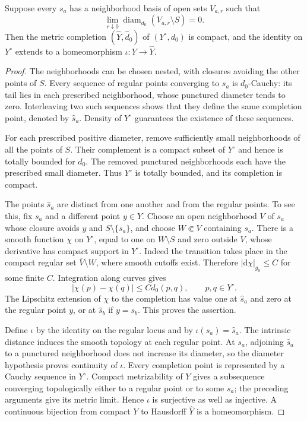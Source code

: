 \begin{lemma}\label{lem:finite-puncture-completion}
Suppose every $s_a$ has a neighborhood basis of open sets $V_{a,r}$ such that
\[
 \lim_{r\downarrow0}\operatorname{diam}_{d_0}(V_{a,r}\setminus S)=0.
\]
Then the metric completion $(\widehat Y,\widehat d_0)$ of $(Y^\circ,d_0)$ is compact, and the identity on $Y^\circ$ extends to a homeomorphism $\iota:Y\to\widehat Y$.
\end{lemma}
\begin{proof}
The neighborhoods can be chosen nested, with closures avoiding the other points of $S$. Every sequence of regular points converging to $s_a$ is $d_0$-Cauchy: its tail lies in each prescribed neighborhood, whose punctured diameter tends to zero. Interleaving two such sequences shows that they define the same completion point, denoted by $\widehat s_a$. Density of $Y^\circ$ guarantees the existence of these sequences.

For each prescribed positive diameter, remove sufficiently small neighborhoods of all the points of $S$. Their complement is a compact subset of $Y^\circ$ and hence is totally bounded for $d_0$. The removed punctured neighborhoods each have the prescribed small diameter. Thus $Y^\circ$ is totally bounded, and its completion is compact.

The points $\widehat s_a$ are distinct from one another and from the regular points. To see this, fix $s_a$ and a different point $y\in Y$. Choose an open neighborhood $V$ of $s_a$ whose closure avoids $y$ and $S\setminus\{s_a\}$, and choose $W\Subset V$ containing $s_a$. There is a smooth function $\chi$ on $Y^\circ$, equal to one on $W\setminus S$ and zero outside $V$, whose derivative has compact support in $Y^\circ$. Indeed the transition takes place in the compact regular set $\overline V\setminus W$, where smooth cutoffs exist. Therefore $|\mathrm{d}\chi|_{g_0}\leq C$ for some finite $C$. Integration along curves gives
\[
 |\chi(p)-\chi(q)|\leq C d_0(p,q),\qquad p,q\in Y^\circ.
\]
The Lipschitz extension of $\chi$ to the completion has value one at $\widehat s_a$ and zero at the regular point $y$, or at $\widehat s_b$ if $y=s_b$. This proves the assertion.

Define $\iota$ by the identity on the regular locus and by $\iota(s_a)=\widehat s_a$. The intrinsic distance induces the smooth topology at each regular point. At $s_a$, adjoining $\widehat s_a$ to a punctured neighborhood does not increase its diameter, so the diameter hypothesis proves continuity of $\iota$. Every completion point is represented by a Cauchy sequence in $Y^\circ$. Compact metrizability of $Y$ gives a subsequence converging topologically either to a regular point or to some $s_a$; the preceding arguments give its metric limit. Hence $\iota$ is surjective as well as injective. A continuous bijection from compact $Y$ to Hausdorff $\widehat Y$ is a homeomorphism.
\end{proof}

